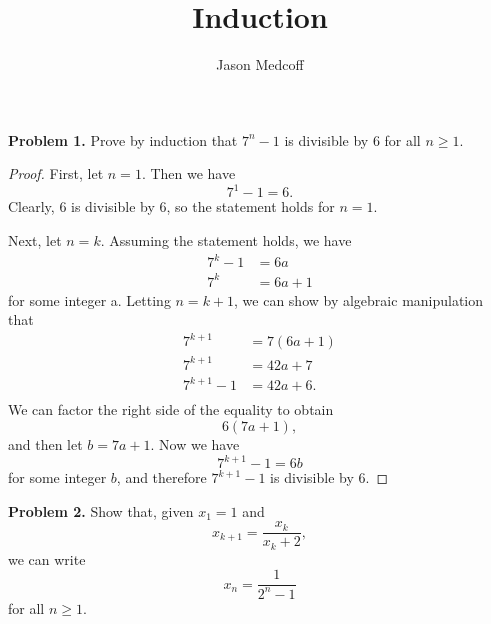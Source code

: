 \documentclass[12pt]{amsart}
\title{Induction}
\author{Jason Medcoff}
\theoremstyle{case}
\begin{document}
	
	\maketitle
	
	\noindent \textbf{Problem 1.} Prove by induction that $7^n - 1$ is divisible by 6 for all $n \geq 1$.
	
	\begin{proof}
		First, let $n = 1$. Then we have
		$$7^1 - 1 = 6 . $$
		Clearly, 6 is divisible by 6, so the statement holds for $n=1$.
		
		Next, let $n=k$. Assuming the statement holds, we have
		$$$$
		\begin{equation*}
		\begin{split}
		7^k - 1 & = 6a \\
		7^k & = 6a + 1
		\end{split}
		\end{equation*}
		for some integer a. Letting $n = k+1$, we can show by algebraic manipulation that
		\begin{equation*}
		\begin{split}
		7^{k+1} & = 7(6a + 1) \\
		7^{k+1} & = 42a + 7 \\
		7^{k+1} - 1 & = 42a + 6 .\\
		\end{split}
		\end{equation*}
		We can factor the right side of the equality to obtain
		$$ 6(7a + 1) ,$$
		and then let $b = 7a + 1$. Now we have
		$$ 7^{k+1} - 1 = 6b $$
		for some integer $b$, and therefore $7^{k+1} - 1$ is divisible by 6.
	\end{proof}
	
	\noindent \textbf{Problem 2.} Show that, given $x_1 = 1$ and
	$$ x_{k+1} = \frac{x_k}{x_k + 2} , $$
	we can write
	$$ x_n = \frac{1}{2^n - 1} $$
	for all $n \geq 1$.
	
\end{document}
